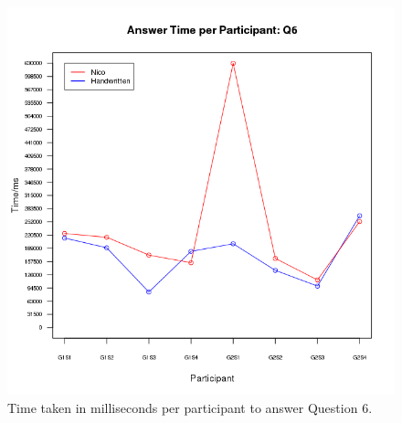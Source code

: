 \documentclass[12pt,twoside,notitlepage,xetex]{report}
\begin{document}
{\begin{center}
\begin{figure}[H]
\begin{center}
\includegraphics[height=\textheight/2-2cm]{figs/graphs/q6.png}
\end{center}
\caption{Time taken in milliseconds per participant to answer Question 6.}
\end{figure}
\end{center}

}
\end{document}
